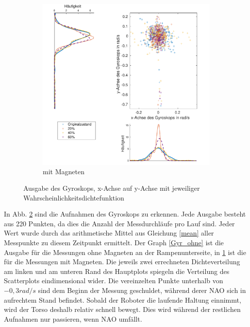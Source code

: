 \begin{figure}[b!]
\begin{adjustwidth}{-0.2\linewidth}{-0.2\linewidth}
		\begin{subfigure}[c]{.5\linewidth}
			\centering
			\includegraphics[width=\linewidth]{Bilder/Gyr_Grund_20_40_60_mitM.pdf}
			\caption{mit Magneten} \label{Gyr_mit}
			\vspace{5pt}
		\end{subfigure}
	\end{adjustwidth}
	\caption{Ausgabe des Gyroskops, x-Achse auf y-Achse mit jeweiliger Wahrscheinlichkeitsdichtefunktion}\label{Gyr}
\end{figure}

In Abb. \ref{Gyr} sind die Aufnahmen des Gyroskops zu erkennen. Jede Ausgabe besteht aus 220 Punkten, da dies die Anzahl der Messdurchläufe pro Lauf sind. Jeder Wert wurde durch das arithmetische Mittel aus Gleichung \eqref{mean} aller Messpunkte zu diesem Zeitpunkt ermittelt. Der Graph \ref{Gyr_ohne} ist die Ausgabe für die Messungen ohne Magneten an der Rampenunterseite, in \ref{Gyr_mit} ist die für die Messungen mit Magneten. Die jeweils zwei errechneten Dichteverteilung am linken und am unteren Rand des Hauptplots spiegeln die Verteilung des Scatterplots eindimensional wider. Die vereinzelten Punkte unterhalb von $-0,3 \unit{rad/s}$ sind dem Beginn der Messung geschuldet, während derer NAO sich in aufrechtem Stand befindet. Sobald der Roboter die laufende Haltung einnimmt, wird der Torso deshalb relativ schnell bewegt. Dies wird während der restlichen Aufnahmen nur passieren, wenn NAO umfällt. 

